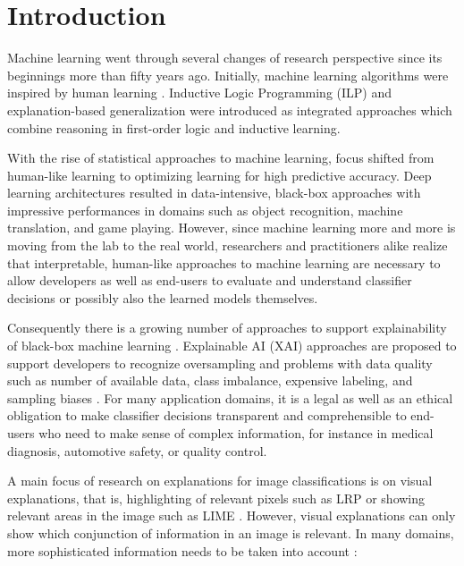 \section{Introduction}

Machine learning went through several changes of research perspective
since its beginnings more than fifty years ago. Initially, machine
learning algorithms were inspired by human learning
\cite{Michalski83a}.  Inductive Logic Programming (ILP)
\cite{muggleton1991inductive} and explanation-based generalization
\cite{mitchell1986explanation} were introduced as integrated
approaches which combine reasoning in first-order logic and inductive
learning.

With the rise of statistical approaches to machine learning, focus
shifted from human-like learning to optimizing learning for high
predictive accuracy. Deep learning architectures
\cite{goodfellow2016deep} resulted in data-intensive, black-box
approaches with impressive performances in domains such as object
recognition, machine translation, and game playing. However, since
machine learning more and more is moving from the lab to the real
world, researchers and practitioners alike realize that interpretable,
human-like approaches to machine learning are necessary to allow
developers as well as end-users to evaluate and understand classifier
decisions or possibly also the learned models themselves. 


Consequently there is a growing number of approaches to support
explainability of black-box machine learning
\cite{adadi2018peeking}. Explainable AI (XAI) approaches are proposed
to support developers to recognize oversampling and problems with data
quality such as number of available data, class imbalance, expensive
labeling, and sampling biases
\cite{lapuschkin2019unmasking,arya2019one}. For many application
domains, it is a legal as well as an ethical obligation to make
classifier decisions transparent and comprehensible to end-users who
need to make sense of complex information, for instance in medical
diagnosis, automotive safety, or quality control. 

A main focus of research on explanations for image classifications is
on visual explanations, that is,  highlighting of relevant pixels such
as LRP \cite{samek2017explainable} or showing relevant areas in the
image such as LIME \cite{ribeiro2016should}. However, visual
explanations can only show which conjunction of information in an
image is relevant. In many domains, more sophisticated information
needs to be taken into account \cite{Schmid2018}:

